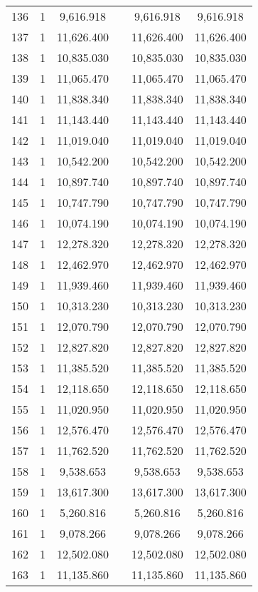 \begin{table}[!htbp]
\begin{tabular}{@{\extracolsep{5pt}}lccccc}
136 & 1 & 9,616.918 &  & 9,616.918 & 9,616.918 \\ 
137 & 1 & 11,626.400 &  & 11,626.400 & 11,626.400 \\ 
138 & 1 & 10,835.030 &  & 10,835.030 & 10,835.030 \\ 
139 & 1 & 11,065.470 &  & 11,065.470 & 11,065.470 \\ 
140 & 1 & 11,838.340 &  & 11,838.340 & 11,838.340 \\ 
141 & 1 & 11,143.440 &  & 11,143.440 & 11,143.440 \\ 
142 & 1 & 11,019.040 &  & 11,019.040 & 11,019.040 \\ 
143 & 1 & 10,542.200 &  & 10,542.200 & 10,542.200 \\ 
144 & 1 & 10,897.740 &  & 10,897.740 & 10,897.740 \\ 
145 & 1 & 10,747.790 &  & 10,747.790 & 10,747.790 \\ 
146 & 1 & 10,074.190 &  & 10,074.190 & 10,074.190 \\ 
147 & 1 & 12,278.320 &  & 12,278.320 & 12,278.320 \\ 
148 & 1 & 12,462.970 &  & 12,462.970 & 12,462.970 \\ 
149 & 1 & 11,939.460 &  & 11,939.460 & 11,939.460 \\ 
150 & 1 & 10,313.230 &  & 10,313.230 & 10,313.230 \\ 
151 & 1 & 12,070.790 &  & 12,070.790 & 12,070.790 \\ 
152 & 1 & 12,827.820 &  & 12,827.820 & 12,827.820 \\ 
153 & 1 & 11,385.520 &  & 11,385.520 & 11,385.520 \\ 
154 & 1 & 12,118.650 &  & 12,118.650 & 12,118.650 \\ 
155 & 1 & 11,020.950 &  & 11,020.950 & 11,020.950 \\ 
156 & 1 & 12,576.470 &  & 12,576.470 & 12,576.470 \\ 
157 & 1 & 11,762.520 &  & 11,762.520 & 11,762.520 \\ 
158 & 1 & 9,538.653 &  & 9,538.653 & 9,538.653 \\ 
159 & 1 & 13,617.300 &  & 13,617.300 & 13,617.300 \\ 
160 & 1 & 5,260.816 &  & 5,260.816 & 5,260.816 \\ 
161 & 1 & 9,078.266 &  & 9,078.266 & 9,078.266 \\ 
162 & 1 & 12,502.080 &  & 12,502.080 & 12,502.080 \\ 
163 & 1 & 11,135.860 &  & 11,135.860 & 11,135.860 \\ 

\end{tabular}
\end{table}
